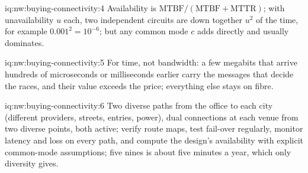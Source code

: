 \begin{solution}{iq:nw:buying-connectivity:4}
Availability is $\mathrm{MTBF}/(\mathrm{MTBF}+\mathrm{MTTR})$; with unavailability $u$ each, two independent circuits are down together $u^2$ of the time,
for example $0.001^2 = 10^{-6}$; but any common mode $c$ adds directly and usually dominates.
\end{solution}

\begin{solution}{iq:nw:buying-connectivity:5}
For time, not bandwidth: a few megabits that arrive hundreds of microseconds or milliseconds earlier carry the messages that decide the races, and
their value exceeds the price; everything else stays on fibre.
\end{solution}

\begin{solution}{iq:nw:buying-connectivity:6}
Two diverse paths from the office to each city (different providers, streets, entries, power), dual connections at each venue from two diverse
points, both active; verify route maps, test fail-over regularly, monitor latency and loss on every path, and compute the design's availability with
explicit common-mode assumptions; five nines is about five minutes a year, which only diversity gives.
\end{solution}
